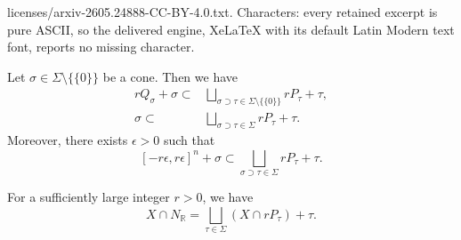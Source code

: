 \documentclass[10pt,a4paper]{amsart}
\def\R{\mathbb{R}}
\begin{document}
licenses/arxiv-2605.24888-CC-BY-4.0.txt. Characters: every retained excerpt is pure ASCII, so the delivered engine, XeLaTeX with its default Latin Modern text font, reports no missing character.
  \begin{lem}\label{lem for unimodular triangulation:label}
   Let $\sigma \in \Sigma \setminus \{ \{ 0 \} \} $ be a cone.
    Then we have 
    \begin{align*}
      rQ_{\sigma } +\sigma 
    \subset &
      \bigsqcup_{\sigma \supset \tau \in \Sigma \setminus \{ \{ 0 \} \}}  rP_{\tau} + \tau  , \\
     \sigma 
    \subset &
      \bigsqcup_{\sigma \supset \tau \in \Sigma }  rP_{\tau} + \tau .
    \end{align*}
  Moreover, 
   there exists $\epsilon >0$ such that 
  $$[-r\epsilon, r\epsilon]^n + \sigma 
    \subset 
      \bigsqcup_{\sigma \supset \tau \in \Sigma }  rP_{\tau} + \tau.
      $$
  \end{lem}

  \begin{lem}\label{existence of nice dual polytope}
   For a sufficiently large integer $r>0$, 
   we have 
      $$ X \cap N_\R = \bigsqcup_{
         \tau \in \Sigma   } 
      ( X \cap r P_{\tau })  + \tau. $$
    \end{lem}  
\end{document}
